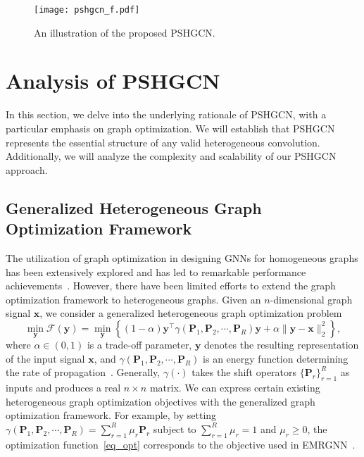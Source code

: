 \documentclass{article}
\begin{document}
 














\begin{figure*}[t]
    \centering
    \texttt{[image: pshgcn\_f.pdf]}
\caption{An illustration of the proposed PSHGCN.}
    \label{fig:scheme}
    \vspace{-3mm}
\end{figure*}






\section{Analysis of PSHGCN}
In this section, we delve into the underlying rationale of PSHGCN, with a particular emphasis on graph optimization. We will establish that PSHGCN represents the essential structure of any valid heterogeneous convolution. Additionally, we will analyze the complexity and scalability of our PSHGCN approach.




\subsection{Generalized Heterogeneous Graph Optimization Framework}
The utilization of graph optimization in designing GNNs for homogeneous graphs has been extensively explored and has led to remarkable performance achievements~\cite{zhou2003learning,twirs,bernnet,HF_HL}. However, there have been limited efforts to extend the graph optimization framework to heterogeneous graphs. Given an $n$-dimensional graph signal $\mathbf{x}$, we consider a generalized heterogeneous graph optimization problem
\begin{equation}
\label{eq_opt}
    \min_{\mathbf{y}} 
    \mathcal{F}(\mathbf{y})= \min_{\mathbf{y}} \left\{(1-\alpha)\mathbf{y}^{\top}\gamma(\mathbf{P}_1,\mathbf{P}_2,\cdots,\mathbf{P}_R)\mathbf{y}+ \alpha\parallel \mathbf{y}-\mathbf{x}\parallel_{2}^{2}\right\},
\end{equation}
where $\alpha \in (0,1)$ is a trade-off parameter, $\mathbf{y}$ denotes the resulting representation of the input signal $\mathbf{x}$, and $\gamma(\mathbf{P}_1,\mathbf{P}_2,\cdots,\mathbf{P}_R)$ is an energy function determining the rate of propagation~\cite{spielman2019spectral}. Generally, $\gamma(\cdot)$ takes the shift operators $\{\mathbf{P}_r\}_{r=1}^R$ as inputs and produces a real $n \times n$ matrix. We can express certain existing heterogeneous graph optimization objectives with the generalized graph optimization framework. For example, by setting $\gamma(\mathbf{P}_1,\mathbf{P}_2,\cdots,\mathbf{P}_R) = \sum\nolimits_{r=1}^{R}\mu_r\mathbf{P}_r$ subject to $\sum\nolimits_{r=1}^{R} \mu_r=1$ and $\mu_r \geq 0$, the optimization function~\eqref{eq_opt} corresponds to the objective used in EMRGNN~\cite{emrgnn}.
\end{document}
